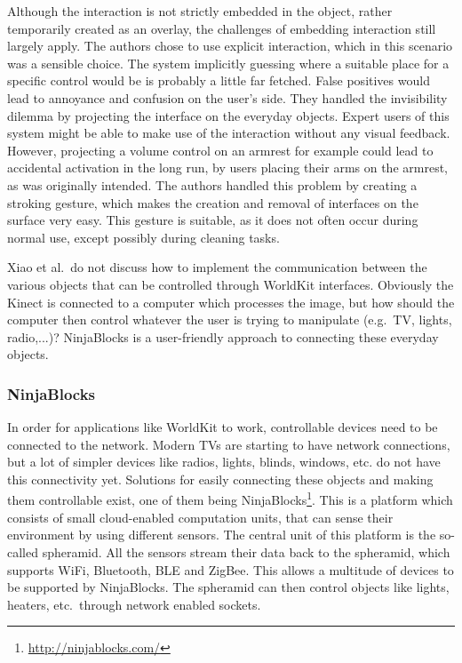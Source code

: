 Although the interaction is not strictly embedded in the object, rather temporarily created as an overlay, the challenges of embedding interaction still largely apply.
The authors chose to use explicit interaction, which in this scenario was a sensible choice.
The system implicitly guessing where a suitable place for a specific control would be is probably a little far fetched. 
False positives would lead to annoyance and confusion on the user's side.
They handled the invisibility dilemma by projecting the interface on the everyday objects.
Expert users of this system might be able to make use of the interaction without any visual feedback. However, projecting a volume control on an armrest for example could lead to accidental activation in the long run, by users placing their arms on the armrest, as was originally intended.
The authors handled this problem by creating a stroking gesture, which makes the creation and removal of interfaces on the surface very easy.
This gesture is suitable, as it does not often occur during normal use, except possibly during cleaning tasks.

Xiao et al.\ do not discuss how to implement the communication between the various objects that can be controlled through WorldKit interfaces.
Obviously the Kinect is connected to a computer which processes the image, but how should the computer then control whatever the user is trying to manipulate (e.g.\ TV, lights, radio,...)?
NinjaBlocks is a user-friendly approach to connecting these everyday objects.

\subsubsection{NinjaBlocks}
\label{sec:ninjaBlocks}
In order for applications like WorldKit to work, controllable devices need to be connected to the network.
Modern TVs are starting to have network connections, but a lot of simpler devices like radios, lights, blinds, windows, etc. do not have this connectivity yet.
Solutions for easily connecting these objects and making them controllable exist, one of them being NinjaBlocks\footnote{\url{http://ninjablocks.com/}}.
This is a platform which consists of small cloud-enabled computation units, that can sense their environment by using different sensors. 
The central unit of this platform is the so-called spheramid.
All the sensors stream their data back to the spheramid, which supports WiFi, Bluetooth, BLE and ZigBee.
This allows a multitude of devices to be supported by NinjaBlocks.
The spheramid can then control objects like lights, heaters, etc.\ through network enabled sockets.

